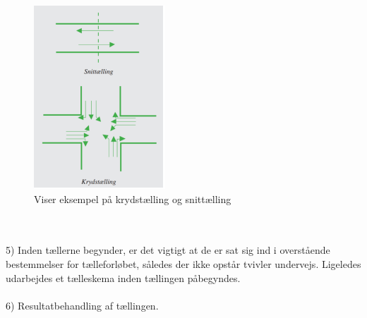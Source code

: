 \begin{figure}[htbp]
  \label{fig:krydstaelling}
  \centering
  \begin{adjustbox}{max width=\textwidth}
    \includegraphics{billederogfigur/krydstaelling.png} %
 \end{adjustbox}
  \caption{Viser eksempel på krydstælling og snittælling}
\end{figure}
~\\\\
5) Inden tællerne begynder, er det vigtigt at de er sat sig ind i overstående bestemmelser for tælleforløbet, således der ikke opstår tvivler undervejs. Ligeledes udarbejdes et tælleskema inden tællingen påbegyndes.
~\\\\
6) Resultatbehandling af tællingen.
